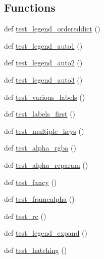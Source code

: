 \subsection*{Functions}
\begin{DoxyCompactItemize}
\item 
def \hyperlink{namespacematplotlib_1_1tests_1_1test__legend_afd56c3eb9d3d6b27be65f032c2dcf785}{test\+\_\+legend\+\_\+ordereddict} ()
\item 
def \hyperlink{namespacematplotlib_1_1tests_1_1test__legend_ab922e113109ebf1b47ed40b8769f0c47}{test\+\_\+legend\+\_\+auto1} ()
\item 
def \hyperlink{namespacematplotlib_1_1tests_1_1test__legend_ac4c1d85932b90f8c0098a71c1882cb9d}{test\+\_\+legend\+\_\+auto2} ()
\item 
def \hyperlink{namespacematplotlib_1_1tests_1_1test__legend_ad3f030bed10cc6dd929102d3b38d38fd}{test\+\_\+legend\+\_\+auto3} ()
\item 
def \hyperlink{namespacematplotlib_1_1tests_1_1test__legend_a131cc1e68bc809a9d7e95a941abe923c}{test\+\_\+various\+\_\+labels} ()
\item 
def \hyperlink{namespacematplotlib_1_1tests_1_1test__legend_a0296a872d59b297d23423dec42e9a9be}{test\+\_\+labels\+\_\+first} ()
\item 
def \hyperlink{namespacematplotlib_1_1tests_1_1test__legend_ac3489fac476cfa1699dd9173af9e1e2a}{test\+\_\+multiple\+\_\+keys} ()
\item 
def \hyperlink{namespacematplotlib_1_1tests_1_1test__legend_a8aef0c677d2b074077bf9048d9c8451a}{test\+\_\+alpha\+\_\+rgba} ()
\item 
def \hyperlink{namespacematplotlib_1_1tests_1_1test__legend_a074b7446c74886630c78a0cb691cb235}{test\+\_\+alpha\+\_\+rcparam} ()
\item 
def \hyperlink{namespacematplotlib_1_1tests_1_1test__legend_a16ead8207f7aee56731c2a83f1d214c5}{test\+\_\+fancy} ()
\item 
def \hyperlink{namespacematplotlib_1_1tests_1_1test__legend_ac88d83b5cd297e2c2808994afd43a732}{test\+\_\+framealpha} ()
\item 
def \hyperlink{namespacematplotlib_1_1tests_1_1test__legend_a8d1ac08cb4fc0a85c6602b54dac10499}{test\+\_\+rc} ()
\item 
def \hyperlink{namespacematplotlib_1_1tests_1_1test__legend_a7d6386330b34db314eafb80ad4b7bcba}{test\+\_\+legend\+\_\+expand} ()
\item 
def \hyperlink{namespacematplotlib_1_1tests_1_1test__legend_a68e2e4e7ba0449a7c24e4940891f2146}{test\+\_\+hatching} ()

\end{DoxyCompactItemize}
